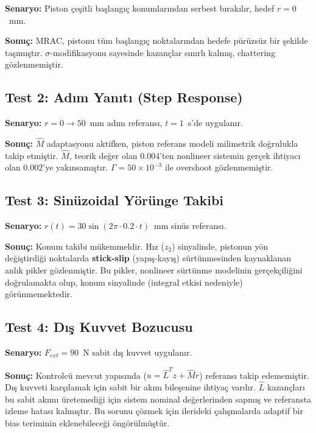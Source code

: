\documentclass[12pt,a4paper]{article}
\begin{document}
\textbf{Senaryo:} Piston çeşitli başlangıç konumlarından serbest bırakılır, hedef $r = 0$~mm.

\textbf{Sonuç:} MRAC, pistonu tüm başlangıç noktalarından hedefe pürüzsüz bir şekilde taşımıştır. $\sigma$-modifikasyonu sayesinde kazançlar sınırlı kalmış, chattering gözlenmemiştir.

\subsection{Test 2: Adım Yanıtı (Step Response)}

\textbf{Senaryo:} $r = 0 \to 50$~mm adım referansı, $t = 1$~s'de uygulanır.

\textbf{Sonuç:} $\hat{M}$ adaptasyonu aktifken, piston referans modeli milimetrik doğrulukla takip etmiştir. $\hat{M}$, teorik değer olan $0.004$'ten nonlineer sistemin gerçek ihtiyacı olan $0.002$'ye yakınsamıştır. $\Gamma = 50 \times 10^{-3}$ ile overshoot gözlenmemiştir.

\subsection{Test 3: Sinüzoidal Yörünge Takibi}

\textbf{Senaryo:} $r(t) = 30\sin(2\pi \cdot 0.2 \cdot t)$~mm sinüs referansı.

\textbf{Sonuç:} Konum takibi mükemmeldir. Hız ($z_2$) sinyalinde, pistonun yön değiştirdiği noktalarda \textbf{stick-slip} (yapış-kayış) sürtünmesinden kaynaklanan anlık pikler gözlenmiştir. Bu pikler, nonlineer sürtünme modelinin gerçekçiliğini doğrulamakta olup, konum sinyalinde (integral etkisi nedeniyle) görünmemektedir.

\subsection{Test 4: Dış Kuvvet Bozucusu}

\textbf{Senaryo:} $F_{ext} = 90$~N sabit dış kuvvet uygulanır.

\textbf{Sonuç:} Kontrolcü mevcut yapısında ($u = \hat{L}^T z + \hat{M} r$) referansı takip edememiştir. Dış kuvveti karşılamak için sabit bir akım bileşenine ihtiyaç vardır. $\hat{L}$ kazançları bu sabit akımı üretemediği için sistem nominal değerlerinden sapmış ve referansta izleme hatası kalmıştır. Bu sorunu çözmek için ilerideki çalışmalarda adaptif bir bias teriminin eklenebileceği öngörülmüştür.

\end{document}
